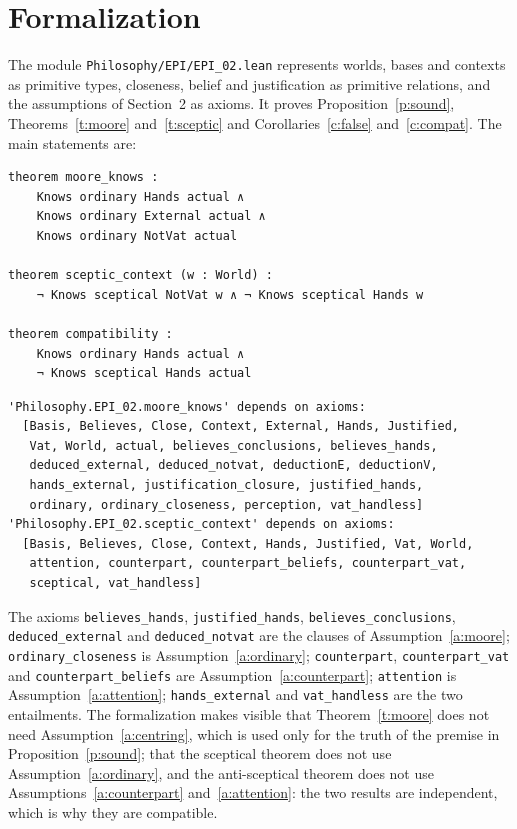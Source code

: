 \documentclass{situationist-preprint}
\begin{document}
\section{Formalization}

The module \nolinkurl{Philosophy/EPI/EPI_02.lean} represents worlds, bases and contexts as primitive types, closeness, belief and justification as primitive relations, and the assumptions of Section~2 as axioms. It proves Proposition~\ref{p:sound}, Theorems~\ref{t:moore} and~\ref{t:sceptic} and Corollaries~\ref{c:false} and~\ref{c:compat}. The main statements are:

\begin{lstlisting}
theorem moore_knows :
    Knows ordinary Hands actual ∧
    Knows ordinary External actual ∧
    Knows ordinary NotVat actual

theorem sceptic_context (w : World) :
    ¬ Knows sceptical NotVat w ∧ ¬ Knows sceptical Hands w

theorem compatibility :
    Knows ordinary Hands actual ∧
    ¬ Knows sceptical Hands actual
\end{lstlisting}

\begin{lstlisting}
'Philosophy.EPI_02.moore_knows' depends on axioms:
  [Basis, Believes, Close, Context, External, Hands, Justified,
   Vat, World, actual, believes_conclusions, believes_hands,
   deduced_external, deduced_notvat, deductionE, deductionV,
   hands_external, justification_closure, justified_hands,
   ordinary, ordinary_closeness, perception, vat_handless]
'Philosophy.EPI_02.sceptic_context' depends on axioms:
  [Basis, Believes, Close, Context, Hands, Justified, Vat, World,
   attention, counterpart, counterpart_beliefs, counterpart_vat,
   sceptical, vat_handless]
\end{lstlisting}

\begin{sloppypar}
The axioms \texttt{believes\_hands}, \texttt{justified\_hands}, \texttt{believes\_conclusions}, \texttt{deduced\_external} and \texttt{deduced\_notvat} are the clauses of Assumption~\ref{a:moore}; \texttt{ordinary\_closeness} is Assumption~\ref{a:ordinary}; \texttt{counterpart}, \texttt{counterpart\_vat} and \texttt{counterpart\_beliefs} are Assumption~\ref{a:counterpart}; \texttt{attention} is Assumption~\ref{a:attention}; \texttt{hands\_external} and \texttt{vat\_handless} are the two entailments. The formalization makes visible that Theorem~\ref{t:moore} does not need Assumption~\ref{a:centring}, which is used only for the truth of the premise in Proposition~\ref{p:sound}; that the sceptical theorem does not use Assumption~\ref{a:ordinary}, and the anti-sceptical theorem does not use Assumptions~\ref{a:counterpart} and~\ref{a:attention}: the two results are independent, which is why they are compatible.
\end{sloppypar}
\end{document}
